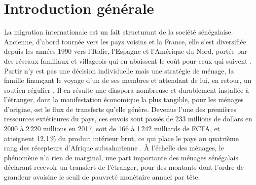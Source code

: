 \section*{Introduction générale}

La migration internationale est un fait structurant de la société
sénégalaise. Ancienne, d'abord tournée vers les pays voisins et la France,
elle s'est diversifiée depuis les années 1990 vers l'Italie, l'Espagne et
l'Amérique du Nord, portée par des réseaux familiaux et villageois qui en
abaissent le coût pour ceux qui suivent \parencite{massey1993, ndiaye2016}.
Partir n'y est pas une décision individuelle mais une stratégie de ménage,
la famille finançant le voyage d'un de ses membres et attendant de lui, en
retour, un soutien régulier \parencite{stark1985}. Il en résulte une
diaspora nombreuse et durablement installée à l'étranger, dont la
manifestation économique la plus tangible, pour les ménages d'origine, est
le flux de transferts qu'elle génère. Devenus l'une des premières
ressources extérieures du pays, ces envois sont passés de 233 millions de
dollars en 2000 à 2\,220 millions en 2017, soit de 166 à 1\,242 milliards
de FCFA, et atteignent 12,1\,\% du produit intérieur brut, ce qui place le
pays au quatrième rang des récepteurs d'Afrique subsaharienne
\parencite{ansd2018profil}. À l'échelle des ménages, le phénomène n'a rien
de marginal, une part importante des ménages sénégalais déclarant recevoir
un transfert de l'étranger, pour des montants dont l'ordre de grandeur
avoisine le seuil de pauvreté monétaire annuel par tête.

